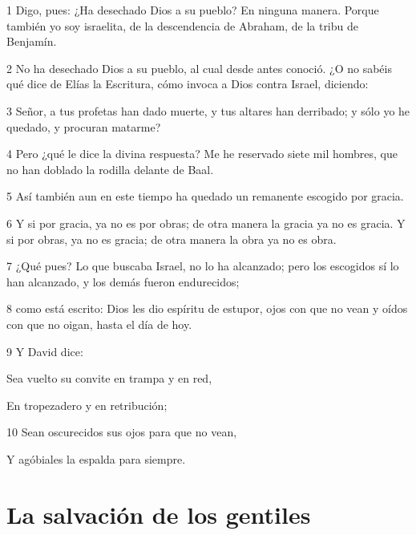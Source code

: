 \par 1 Digo, pues: ¿Ha desechado Dios a su pueblo? En ninguna manera. Porque también yo soy israelita, de la descendencia de Abraham, de la tribu de Benjamín.
\par 2 No ha desechado Dios a su pueblo, al cual desde antes conoció. ¿O no sabéis qué dice de Elías la Escritura, cómo invoca a Dios contra Israel, diciendo:
\par 3 Señor, a tus profetas han dado muerte, y tus altares han derribado; y sólo yo he quedado, y procuran matarme?
\par 4 Pero ¿qué le dice la divina respuesta? Me he reservado siete mil hombres, que no han doblado la rodilla delante de Baal.
\par 5 Así también aun en este tiempo ha quedado un remanente escogido por gracia.
\par 6 Y si por gracia, ya no es por obras; de otra manera la gracia ya no es gracia. Y si por obras, ya no es gracia; de otra manera la obra ya no es obra.
\par 7 ¿Qué pues? Lo que buscaba Israel, no lo ha alcanzado; pero los escogidos sí lo han alcanzado, y los demás fueron endurecidos;
\par 8 como está escrito: Dios les dio espíritu de estupor, ojos con que no vean y oídos con que no oigan, hasta el día de hoy.
\par 9 Y David dice:
\par Sea vuelto su convite en trampa y en red,
\par En tropezadero y en retribución;
\par 10 Sean oscurecidos sus ojos para que no vean,
\par Y agóbiales la espalda para siempre.

\section*{La salvación de los gentiles}

